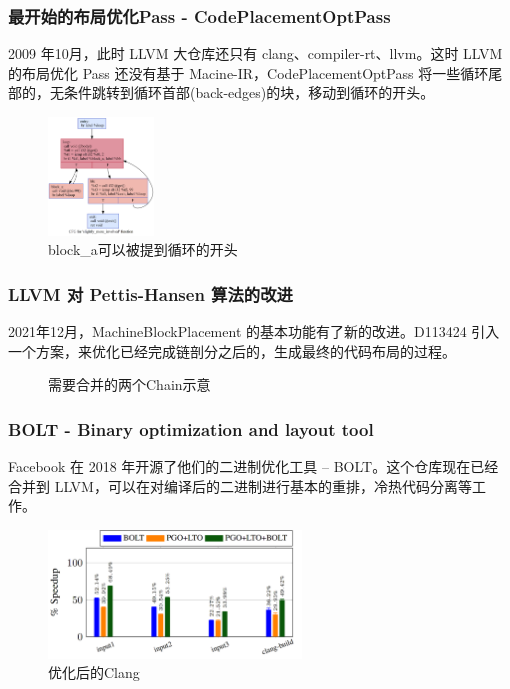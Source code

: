 \begin{frame}
    \frametitle{最开始的布局优化Pass - CodePlacementOptPass}

    2009 年10月，此时 LLVM 大仓库还只有 clang、compiler-rt、llvm。这时 LLVM 的布局优化 Pass 还没有基于 Macine-IR，CodePlacementOptPass \cite{llvmcodeplacementopt2009}将一些循环尾部的，无条件跳转到循环首部(back-edges)的块，移动到循环的开头。

    \begin{figure}
        \centering
        \includegraphics[width=0.25\textwidth]{images/slightly_more_involved.png}
        \caption{block\_a可以被提到循环的开头}
    \end{figure}

\end{frame}


\begin{frame}
    \frametitle{LLVM 对 Pettis-Hansen 算法的改进}

    2021年12月，MachineBlockPlacement 的基本功能有了新的改进。D113424\cite{llvmexttspbbl2021} 引入一个方案，来优化已经完成链剖分之后的，生成最终的代码布局的过程。

    \begin{figure}
        
        \caption{需要合并的两个Chain示意}
    \end{figure}

\end{frame}

\begin{frame}
    \frametitle{BOLT - Binary optimization and layout tool}

    Facebook 在 2018 年开源了他们的二进制优化工具 -- BOLT\cite{facebook2018bolt}\cite{panchenko2019bolt}。这个仓库现在已经合并到 LLVM，可以在对编译后的二进制进行基本的重排，冷热代码分离等工作。

    \begin{figure}
        \centering
        \includegraphics[width=0.6\textwidth]{images/perf_improv_clang.png}
        \caption{优化后的Clang}
    \end{figure}

\end{frame}